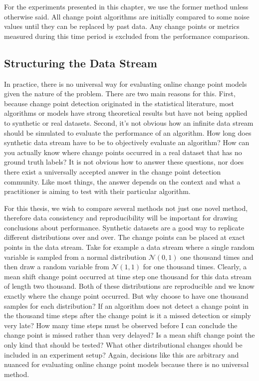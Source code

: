 For the experiments presented in this chapter, we use the former method unless otherwise said. All change point algorithms are initially compared to some noise values until they can be replaced by past data. Any change points or metrics measured during this time period is excluded from the performance comparison. %

\subsection{Structuring the Data Stream}
In practice, there is no universal way for evaluating online change point models given the nature of the problem. There are two main reasons for this. First, because change point detection originated in the statistical literature, most algorithms or models have strong theoretical results but have not being applied to synthetic or real datasets. Second, it's not obvious how an infinite data stream should be simulated to evaluate the performance of an algorithm. How long does synthetic data stream have to be to objectively evaluate an algorithm?  How can you actually know where change points occurred in a real dataset that has no ground truth labels? It is not obvious how to answer these questions, nor does there exist a universally accepted answer in the change point detection community. Like most things, the answer depends on the context and what a practitioner is aiming to test with their particular algorithm.  

For this thesis, we wish to compare several methods not just one novel method, therefore data consistency and reproducibility will be important for drawing conclusions about performance. Synthetic datasets are a good way to replicate different distributions over and over. The change points can be placed at exact points in the data stream. Take for example a data stream where a single random variable is sampled from a normal distribution $\mathcal{N}(0,1)$ one thousand times and then draw a random variable from $\mathcal{N}(1,1)$ for one thousand times. Clearly, a mean shift change point occurred at time step one thousand for this data stream of length two thousand. Both of these distributions are reproducible and we know exactly where the change point occurred. But why choose to have one thousand samples for each distribution? If an algorithm does not detect a change point in the thousand time steps after the change point is it a missed detection or simply very late? How many time steps must be observed before I can conclude the change point is missed rather than very delayed? Is a mean shift change point the only kind that should be tested? What other distributional changes should be included in an experiment setup? Again, decisions like this are arbitrary and nuanced for evaluating online change point models because there is no universal method. 

